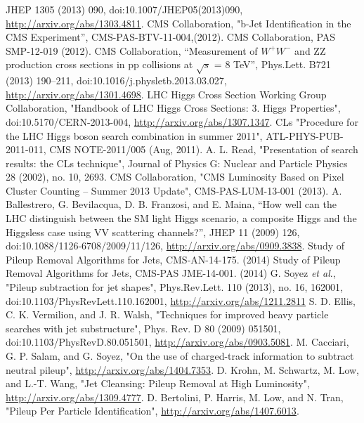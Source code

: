 \begin{thebibliography}{99}
JHEP 1305 (2013) 090, doi:10.1007/JHEP05(2013)090, \url{http://arxiv.org/abs/1303.4811}.
 {CMS Collaboration}, "b-Jet Identification in the CMS Experiment”, CMS-PAS-BTV-11-004,(2012).
 CMS Collaboration, PAS SMP-12-019 (2012).
 CMS Collaboration, “Measurement of $W^+W^-$ and ZZ production cross
sections in pp collisions at $\sqrt{s}$ = 8 TeV”, Phys.Lett. B721 (2013) 190–211,
doi:10.1016/j.physletb.2013.03.027, \url{http://arxiv.org/abs/1301.4698}.
 LHC Higgs Cross Section Working Group Collaboration, "Handbook of LHC Higgs
Cross Sections: 3. Higgs Properties", doi:10.5170/CERN-2013-004, \url{http://arxiv.org/abs/1307.1347}.
 CLs "Procedure for the LHC Higgs boson search combination in summer 2011", ATL-PHYS-PUB-2011-011, CMS NOTE-2011/005 (Aug, 2011).
 {A. L. Read}, "Presentation of search results: the CLs technique", Journal of Physics G: Nuclear and Particle Physics 28 (2002), no. 10, 2693.
 CMS Collaboration, "CMS Luminosity Based on Pixel Cluster Counting – Summer 2013 Update", CMS-PAS-LUM-13-001 (2013).
 {A. Ballestrero}, G. Bevilacqua, D. B. Franzosi, and E. Maina, “How well can the LHC
distinguish between the SM light Higgs scenario, a composite Higgs and the Higgsless
case using VV scattering channels?”, JHEP 11 (2009) 126,
doi:10.1088/1126-6708/2009/11/126, \url{http://arxiv.org/abs/0909.3838}.
 Study of Pileup Removal Algorithms for Jets, CMS-AN-14-175. (2014)
 Study of Pileup Removal Algorithms for Jets, CMS-PAS JME-14-001. (2014)
 G. Soyez {\it et al}., "Pileup subtraction for jet shapes", Phys.Rev.Lett. 110 (2013), no. 16, 162001, doi:10.1103/PhysRevLett.110.162001, \url{http://arxiv.org/abs/1211.2811}
 S. D. Ellis, C. K. Vermilion, and J. R. Walsh, "Techniques for improved heavy particle
searches with jet substructure", Phys. Rev. D 80 (2009) 051501, doi:10.1103/PhysRevD.80.051501, \url{http://arxiv.org/abs/0903.5081}.
 M. Cacciari, G. P. Salam, and G. Soyez, "On the use of charged-track information to subtract neutral pileup", \url{http://arxiv.org/abs/1404.7353}.
 D. Krohn, M. Schwartz, M. Low, and L.-T. Wang, "Jet Cleansing: Pileup Removal at High
Luminosity", \url{http://arxiv.org/abs/1309.4777}.
 D. Bertolini, P. Harris, M. Low, and N. Tran, "Pileup Per Particle Identification", \url{http://arxiv.org/abs/1407.6013}.

\end{thebibliography}
